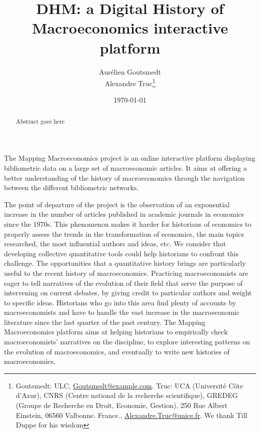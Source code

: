 \documentclass[JEL]{AEA}
\begin{document}
\title{DHM: a Digital History of Macroeconomics interactive platform}


\author{
  Aurélien Goutsmedt\\
  Alexandre Truc\thanks{
  Goutsmedt: ULC, \href{mailto:Goutsmedt@example.com}{Goutsmedt@example.com}.
  Truc: UCA (Université Côte d'Azur), CNRS (Centre national de la
recherche scientifique), GREDEG (Groupe de Recherche en Droit, Economie,
Gestion), 250 Rue Albert Einstein, 06560 Valbonne.
France., \href{mailto:Alexandre.Truc@unice.fr}{Alexandre.Truc@unice.fr}.
  We thank Till Duppe for his wisdom
}
}

\date{\today}

\begin{abstract}
Abstract goes here
\end{abstract}


\maketitle

The Mapping Macroeconomics project is an online interactive platform
displaying bibliometric data on a large set of macroeconomic articles.
It aims at offering a better understanding of the history of
macroeconomics through the navigation between the different bibliometric
networks.

The point of departure of the project is the observation of an
exponential increase in the number of articles published in academic
journals in economics since the 1970s. This phenomenon makes it harder
for historians of economics to properly assess the trends in the
transformation of economics, the main topics researched, the most
influential authors and ideas, etc. We consider that developing
collective quantitative tools could help historians to confront this
challenge. The opportunities that a quantitative history brings are
particularly useful to the recent history of macroeconomics. Practicing
macroeconomists are eager to tell narratives of the evolution of their
field that serve the purpose of intervening on current debates, by
giving credit to particular authors and weight to specific ideas.
Historians who go into this area find plenty of accounts by
macroeconomists and have to handle the vast increase in the
macroeconomic literature since the last quarter of the past century. The
Mapping Macroeconomics platform aims at helping historians to
empirically check macroeconomists' narratives on the discipline, to
explore interesting patterns on the evolution of macroeconomics, and
eventually to write new histories of macroeconomics.
\end{document}
